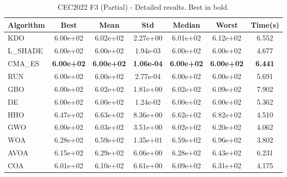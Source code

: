 \begin{table}[H]
\centering\small
\caption{CEC2022 F3 (Partial) - Detailed results. Best in bold.}
\label{tab:cec2022_F3}
\begin{tabular}{lcccccc}
\toprule
\textbf{Algorithm} & \textbf{Best} & \textbf{Mean} & \textbf{Std} & \textbf{Median} & \textbf{Worst} & \textbf{Time(s)} \\
\midrule
KDO & 6.00e+02 & 6.02e+02 & 2.27e+00 & 6.01e+02 & 6.12e+02 & 6.552 \\
L_SHADE & 6.00e+02 & 6.00e+02 & 1.94e-03 & 6.00e+02 & 6.00e+02 & 4.677 \\
CMA_ES & \textbf{6.00e+02} & \textbf{6.00e+02} & \textbf{1.06e-04} & \textbf{6.00e+02} & \textbf{6.00e+02} & \textbf{6.441} \\
RUN & 6.00e+02 & 6.00e+02 & 2.77e-04 & 6.00e+02 & 6.00e+02 & 5.691 \\
GBO & 6.00e+02 & 6.02e+02 & 1.81e+00 & 6.02e+02 & 6.09e+02 & 7.902 \\
DE & 6.00e+02 & 6.00e+02 & 1.24e-02 & 6.00e+02 & 6.00e+02 & 5.362 \\
HHO & 6.47e+02 & 6.63e+02 & 8.36e+00 & 6.62e+02 & 6.82e+02 & 4.510 \\
GWO & 6.00e+02 & 6.03e+02 & 3.51e+00 & 6.02e+02 & 6.20e+02 & 4.062 \\
WOA & 6.28e+02 & 6.59e+02 & 1.35e+01 & 6.59e+02 & 6.96e+02 & 3.802 \\
AVOA & 6.15e+02 & 6.29e+02 & 6.06e+00 & 6.28e+02 & 6.43e+02 & 6.231 \\
COA & 6.01e+02 & 6.10e+02 & 6.61e+00 & 6.09e+02 & 6.31e+02 & 4.175 \\
\bottomrule
\end{tabular}
\end{table}
